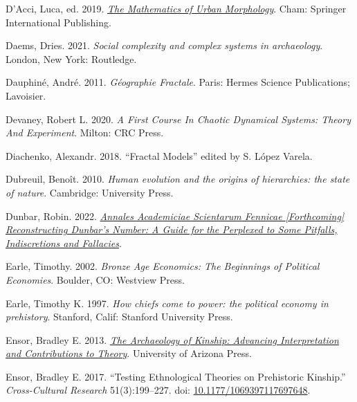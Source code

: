 \documentclass[
  12pt,
]{book}
\newlength{\cslhangindent}
\newlength{\cslentryspacingunit} %
\newenvironment{CSLReferences}[2] %
 {%
  \setlength{\parindent}{0pt}
  \ifodd #1
  \let\oldpar\par
  \def\par{\hangindent=\cslhangindent\oldpar}
  \fi
  \setlength{\parskip}{#2\cslentryspacingunit}
 }%
 {}
\begin{document}
\begin{CSLReferences}{1}{0}
\leavevmode{}%
D'Acci, Luca, ed. 2019. \emph{\href{https://doi.org/10.1007/978-3-030-12381-9}{The Mathematics of Urban Morphology}}. Cham: Springer International Publishing.

\leavevmode{}%
Daems, Dries. 2021. \emph{Social complexity and complex systems in archaeology}. London, New York: Routledge.

\leavevmode{}%
Dauphiné, André. 2011. \emph{Géographie Fractale}. Paris: Hermes Science Publications; Lavoisier.

\leavevmode{}%
Devaney, Robert L. 2020. \emph{A First Course In Chaotic Dynamical Systems: Theory And Experiment}. Milton: CRC Press.

\leavevmode{}%
Diachenko, Alexandr. 2018. {``Fractal Models''} edited by S. López Varela.

\leavevmode{}%
Dubreuil, Benoît. 2010. \emph{Human evolution and the origins of hierarchies: the state of nature}. Cambridge: University Press.

\leavevmode{}%
Dunbar, Robin. 2022. \emph{\href{https://doi.org/10.13140/RG.2.2.34145.58727}{Annales Academiciae Scientarum Fennicae {[}Forthcoming{]} Reconstructing Dunbar's Number: A Guide for the Perplexed to Some Pitfalls, Indiscretions and Fallacies}}.

\leavevmode{}%
Earle, Timothy. 2002. \emph{Bronze Age Economics: The Beginnings of Political Economies}. Boulder, CO: Westview Press.

\leavevmode{}%
Earle, Timothy K. 1997. \emph{How chiefs come to power: the political economy in prehistory}. Stanford, Calif: Stanford University Press.

\leavevmode{}%
Ensor, Bradley E. 2013. \emph{\href{https://www.jstor.org/stable/j.ctt183pcj3}{The Archaeology of Kinship: Advancing Interpretation and Contributions to Theory}}. University of Arizona Press.

\leavevmode{}%
Ensor, Bradley E. 2017. {``Testing Ethnological Theories on Prehistoric Kinship.''} \emph{Cross-Cultural Research} 51(3):199--227. doi: \href{https://doi.org/10.1177/1069397117697648}{10.1177/1069397117697648}.


\end{CSLReferences}
\end{document}
